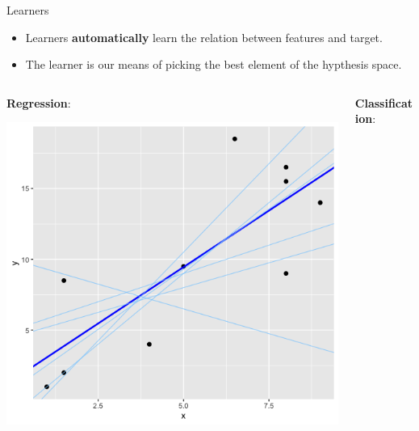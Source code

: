 \documentclass[11pt,compress,t,notes=noshow, xcolor=table]{beamer}
\begin{document}
\begin{vbframe}{Learners}

\begin{itemize}

\item Learners \textbf{automatically} learn the relation between features and target.
\item The learner is our means of picking the best element of the hypthesis space.
\end{itemize} \hspace{0.4cm}

\begin{columns}    
\begin{column}{0.4\textwidth} 
\textbf{Regression}: 

  \begin{center}
    \includegraphics[width=\textwidth]{figure_man/Model_Regression_Plot.png} 
  \end{center}
\end{column}    

\begin{column}{0.4\textwidth} 
\textbf{Classification}:
  

\end{column}
\end{columns}
\end{vbframe}
\end{document}
